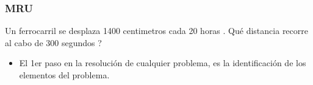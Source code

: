 \documentclass{beamer}
\begin{document}
\begin{frame}
\frametitle{MRU}
% 
Un {{ ferrocarril }} {{ se desplaza }} {{ 1400 centimetros }} cada {{ 20 horas }}. Qu\'e {{ distancia }} recorre al cabo de {{ 300 segundos ?}} %


\begin{itemize}
\item El 1er paso en la resoluci\'on de cualquier problema, es la
identificaci\'on de los elementos del problema.
\end{itemize}



\end{frame}
\end{document}
